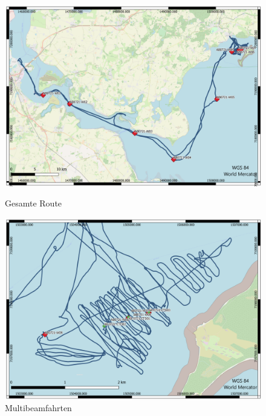 \begin{figure}[]
    \begin{minipage}{0.48\textwidth}
        \centering
        \includegraphics[width=1\linewidth]{Bilder/QGIS/Gesamte_route.png}
        \caption{Gesamte Route}
        \label{fig:route}
    \end{minipage}
    \begin{minipage}{0.48\textwidth}
        \centering
        \includegraphics[width=1\linewidth]{Bilder/QGIS/multibeam.png}
        \caption{Multibeamfahrten}
        \label{fig:multibeam_route}
    \end{minipage}
\end{figure}
